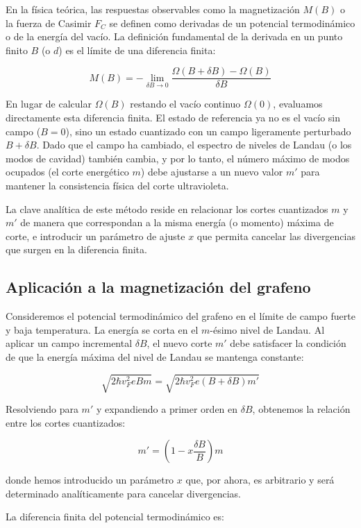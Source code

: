 En la física teórica, las respuestas observables como la magnetización $M(B)$ o la fuerza de Casimir $F_C$ se definen como derivadas de un potencial termodinámico o de la energía del vacío. La definición fundamental de la derivada en un punto finito $B$ (o $d$) es el límite de una diferencia finita:

$$ M(B) = - \lim_{\delta B \to 0} \frac{\Omega(B + \delta B) - \Omega(B)}{\delta B} $$

En lugar de calcular $\Omega(B)$ restando el vacío continuo $\Omega(0)$, evaluamos directamente esta diferencia finita. El estado de referencia ya no es el vacío sin campo ($B=0$), sino un estado cuantizado con un campo ligeramente perturbado $B + \delta B$. Dado que el campo ha cambiado, el espectro de niveles de Landau (o los modos de cavidad) también cambia, y por lo tanto, el número máximo de modos ocupados (el corte energético $m$) debe ajustarse a un nuevo valor $m'$ para mantener la consistencia física del corte ultravioleta.

La clave analítica de este método reside en relacionar los cortes cuantizados $m$ y $m'$ de manera que correspondan a la misma energía (o momento) máxima de corte, e introducir un parámetro de ajuste $x$ que permita cancelar las divergencias que surgen en la diferencia finita.

\subsection{Aplicación a la magnetización del grafeno}

Consideremos el potencial termodinámico del grafeno en el límite de campo fuerte y baja temperatura. La energía se corta en el $m$-ésimo nivel de Landau. Al aplicar un campo incremental $\delta B$, el nuevo corte $m'$ debe satisfacer la condición de que la energía máxima del nivel de Landau se mantenga constante:

$$ \sqrt{2\hbar v_F^2 e B m} = \sqrt{2\hbar v_F^2 e (B + \delta B) m'} $$

Resolviendo para $m'$ y expandiendo a primer orden en $\delta B$, obtenemos la relación entre los cortes cuantizados:

$$ m' = \left(1 - x \frac{\delta B}{B}\right) m $$

donde hemos introducido un parámetro $x$ que, por ahora, es arbitrario y será determinado analíticamente para cancelar divergencias. 

La diferencia finita del potencial termodinámico es:

